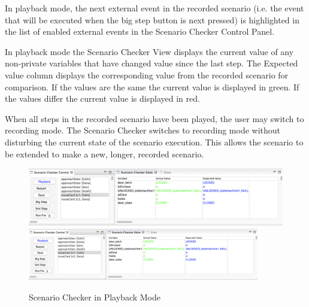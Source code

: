 In playback mode, the next external event in the recorded scenario (i.e. the event that will be executed when the big step button is next pressed) is highlighted in the list of enabled external events in the Scenario Checker Control Panel.

In playback mode the Scenario Checker View displays the current value of any non-private variables that have changed value since the last step.
The Expected value column displays the corresponding value from the recorded scenario for comparison.
If the values are the same the current value is displayed in green. 
If the values differ the current value is displayed in red.

When all steps in the recorded scenario have been played, the user may switch to recording mode. 
The Scenario Checker switches to recording mode without disturbing the current state of the scenario execution. 
This allows the scenario to be extended to make a new, longer, recorded scenario.

\begin{figure}[!htbp]
	\centering
	\ifplastex
	\includegraphics[width=900]{figures/playback}
	\else
	\includegraphics[width=0.9\textwidth]{figures/playback}
	\fi
	\caption{Scenario Checker in Playback Mode}
	\label{fig:playback}
\end{figure}



